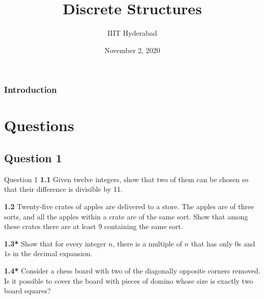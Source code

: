 \documentclass[xcolor=svgnames]{beamer}
\title[Discrete Structures]{Discrete Structures} %
\author{IIIT Hyderabad} %
\institute[] %
{
Monsoon 2020 \\ %
\medskip
\textit{Tutorial 13} %
}
\date{November 2, 2020} %
\begin{document}
\begin{frame}
\titlepage %
\end{frame}

\begin{frame}
\frametitle{Introduction} %
\tableofcontents %
\end{frame}


\section{Questions}

\subsection{Question 1}

\begin{frame}{Question 1}
    \textbf{1.1} Given twelve integers, show that two of them can be chosen so that their difference is divisible by 11.
    
    \textbf{1.2} Twenty-five crates of apples are delivered to a store. The apples are of three sorts, and all the apples within a crate are of the same sort. Show that among these crates there are at least 9 containing the same sort. 
    
    \textbf{1.3*} Show that for every integer $n$, there is a multiple of $n$ that has only $0$s and $1$s in the decimal expansion.
    
    \textbf{1.4*} Consider a chess board with two of the diagonally opposite corners removed. Is it possible to cover the board with pieces of domino whose size is exactly two board squares?
\end{frame}
\end{document}
